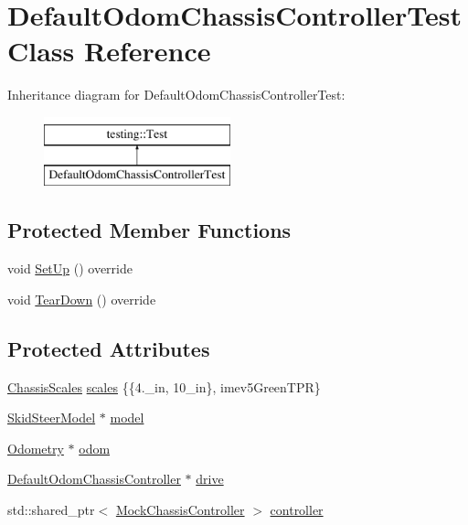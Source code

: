 \hypertarget{classDefaultOdomChassisControllerTest}{}\section{Default\+Odom\+Chassis\+Controller\+Test Class Reference}
\label{classDefaultOdomChassisControllerTest}
Inheritance diagram for Default\+Odom\+Chassis\+Controller\+Test\+:\begin{figure}[H]
\begin{center}
\leavevmode
\includegraphics[height=2.000000cm]{classDefaultOdomChassisControllerTest}
\end{center}
\end{figure}
\subsection*{Protected Member Functions}
\begin{DoxyCompactItemize}
\item 
void \mbox{\hyperlink{classDefaultOdomChassisControllerTest_acddc92722bb94402d156cd0a763cdf4d}{Set\+Up}} () override
\item 
void \mbox{\hyperlink{classDefaultOdomChassisControllerTest_a1ca99acb21335c71c66d00f862a97b5d}{Tear\+Down}} () override
\end{DoxyCompactItemize}
\subsection*{Protected Attributes}
\begin{DoxyCompactItemize}
\item 
\mbox{\hyperlink{classokapi_1_1ChassisScales}{Chassis\+Scales}} \mbox{\hyperlink{classDefaultOdomChassisControllerTest_a9f6e35a3b24a79f9e4686bb0c87de371}{scales}} \{\{4.\+\_\+in, 10\+\_\+in\}, imev5\+Green\+T\+P\+R\}
\item 
\mbox{\hyperlink{classokapi_1_1SkidSteerModel}{Skid\+Steer\+Model}} $\ast$ \mbox{\hyperlink{classDefaultOdomChassisControllerTest_aefe0696ee7c51986f7883ae6fd8edecd}{model}}
\item 
\mbox{\hyperlink{classokapi_1_1Odometry}{Odometry}} $\ast$ \mbox{\hyperlink{classDefaultOdomChassisControllerTest_adffa3b2fca0b03a6efc3f95b4339af4a}{odom}}
\item 
\mbox{\hyperlink{classokapi_1_1DefaultOdomChassisController}{Default\+Odom\+Chassis\+Controller}} $\ast$ \mbox{\hyperlink{classDefaultOdomChassisControllerTest_ac1346d4ec1538d0f6b8915adf2dbb575}{drive}}
\item 
std\+::shared\+\_\+ptr$<$ \mbox{\hyperlink{classokapi_1_1MockChassisController}{Mock\+Chassis\+Controller}} $>$ \mbox{\hyperlink{classDefaultOdomChassisControllerTest_a93cf47dffd783de65c755ab79919ce48}{controller}}
\end{DoxyCompactItemize}
